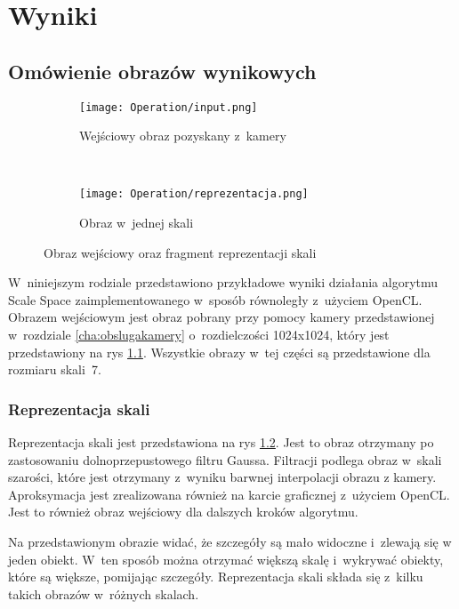 \chapter{Wyniki}
\label{cha:wyniki}

\section{Omówienie obrazów wynikowych}
\label{sec:testy}

\begin{figure}[h]
\begin{center}

\begin{subfigure}[t]{0.3\textwidth}
\texttt{[image: Operation/input.png]}
\caption{Wejściowy obraz pozyskany z~kamery}
\label{fig:input}
\end{subfigure}
~
\begin{subfigure}[t]{0.3\textwidth}
\texttt{[image: Operation/reprezentacja.png]}
\caption{Obraz w~jednej skali}
\label{fig:dzialanieRep}
\end{subfigure}

\end{center}
\label{fig:inputIDzialanie}
\caption{Obraz wejściowy oraz fragment reprezentacji skali}
\end{figure}

W~niniejszym rodziale przedstawiono przykładowe wyniki działania algorytmu Scale Space zaimplementowanego w~sposób równoległy z~użyciem OpenCL. Obrazem wejściowym jest obraz pobrany przy pomocy kamery przedstawionej w~rozdziale \ref{cha:obslugakamery} o~rozdielczości 1024x1024, który jest przedstawiony na rys \ref{fig:input}. Wszystkie obrazy w~tej części są przedstawione dla rozmiaru skali~7.

\subsection{Reprezentacja skali}
\label{sec:dzialanieRep}

Reprezentacja skali jest przedstawiona na rys \ref{fig:dzialanieRep}. Jest to obraz otrzymany po zastosowaniu dolnoprzepustowego filtru Gaussa. Filtracji podlega obraz w~skali szarości, które jest otrzymany z~wyniku barwnej interpolacji obrazu z kamery. Aproksymacja jest zrealizowana również na karcie graficznej z~użyciem OpenCL. Jest to również obraz wejściowy dla dalszych kroków algorytmu.

Na przedstawionym obrazie widać, że szczegóły są mało widoczne i~zlewają się w jeden obiekt. W~ten sposób można otrzymać większą skalę i~wykrywać obiekty, które są większe, pomijając szczegóły. Reprezentacja skali składa się z~kilku takich obrazów w~różnych skalach.


